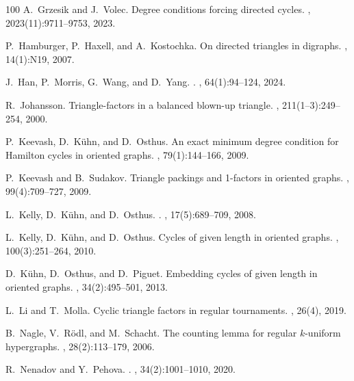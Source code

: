 \documentclass[11pt,a4paper,reqno]{amsart}
\theoremstyle{definition} %
\begin{document}
\begin{thebibliography}{100}
	A.~Grzesik and J.~Volec.
	\newblock Degree conditions forcing directed cycles.
	, 2023(11):9711--9753, 2023.
	
	P.~Hamburger, P.~Haxell, and A.~Kostochka.
	\newblock On directed triangles in digraphs.
	, 14(1):N19, 2007.
	
	J.~Han, P.~Morris, G.~Wang, and D.~Yang.
	.
	, 64(1):94--124, 2024.
	
	R.~Johansson.
	\newblock Triangle-factors in a balanced blown-up triangle.
	, 211(1--3):249--254, 2000.
	
	P.~Keevash, D.~K\"uhn, and D.~Osthus.
	\newblock An exact minimum degree condition for {H}amilton cycles in oriented
	graphs.
	, 79(1):144--166, 2009.
	
	P.~Keevash and B.~Sudakov.
	\newblock Triangle packings and 1-factors in oriented graphs.
	, 99(4):709--727, 2009.
	
	L.~Kelly, D.~K{\"u}hn, and D.~Osthus.
	.
	, 17(5):689--709, 2008.
	
	L.~Kelly, D.~K\"uhn, and D.~Osthus.
	\newblock Cycles of given length in oriented graphs.
	, 100(3):251--264, 2010.
	
	D.~K\"uhn, D.~Osthus, and D.~Piguet.
	\newblock Embedding cycles of given length in oriented graphs.
	, 34(2):495--501, 2013.
	
	L.~Li and T.~Molla.
	\newblock Cyclic triangle factors in regular tournaments.
	, 26(4), 2019.
	
	B.~Nagle, V.~R{\"o}dl, and M.~Schacht.
	\newblock The counting lemma for regular $k$-uniform hypergraphs.
	, 28(2):113--179, 2006.
	
	R.~Nenadov and Y.~Pehova.
	.
	, 34(2):1001--1010, 2020.
	

\end{thebibliography}
\end{document}
